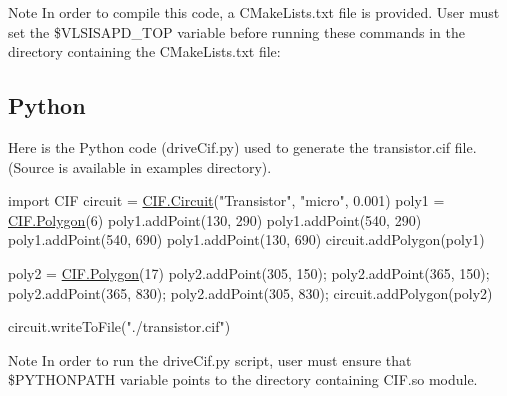 \begin{DoxyNote}{Note}
In order to compile this code, a C\+Make\+Lists.\+txt file is provided. User must set the \$\+V\+L\+S\+I\+S\+A\+P\+D\+\_\+\+T\+OP variable before running these commands in the directory containing the C\+Make\+Lists.\+txt file\+: 
\begin{DoxyCode}
\end{DoxyCode}

\end{DoxyNote}
\hypertarget{cif_cifPython}{}\subsection{Python}\label{cif_cifPython}
Here is the Python code ({\ttfamily drive\+Cif.\+py}) used to generate the transistor.\+cif file. (Source is available in examples directory). 
\begin{DoxyCodeInclude}
\textcolor{keyword}{import} CIF
circuit = \hyperlink{class_c_i_f_1_1_circuit}{CIF.Circuit}(\textcolor{stringliteral}{"Transistor"}, \textcolor{stringliteral}{"micro"}, 0.001)
poly1 = \hyperlink{class_c_i_f_1_1_polygon}{CIF.Polygon}(6)
poly1.addPoint(130, 290)
poly1.addPoint(540, 290)
poly1.addPoint(540, 690)
poly1.addPoint(130, 690)
circuit.addPolygon(poly1)
    
poly2 = \hyperlink{class_c_i_f_1_1_polygon}{CIF.Polygon}(17)
poly2.addPoint(305, 150);
poly2.addPoint(365, 150);
poly2.addPoint(365, 830);
poly2.addPoint(305, 830);
circuit.addPolygon(poly2)

circuit.writeToFile(\textcolor{stringliteral}{"./transistor.cif"})
\end{DoxyCodeInclude}


\begin{DoxyNote}{Note}
In order to run the {\ttfamily drive\+Cif.\+py} script, user must ensure that \$\+P\+Y\+T\+H\+O\+N\+P\+A\+TH variable points to the directory containing C\+I\+F.\+so module. 
\end{DoxyNote}
